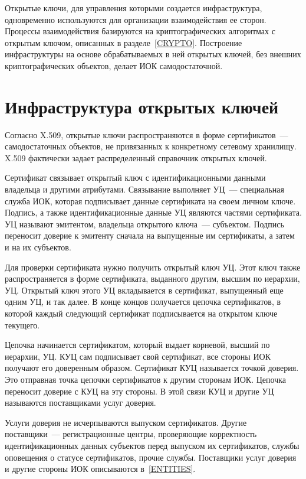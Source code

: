 Открытые ключи, для управления которыми создается инфраструктура,
одновременно используются для организации взаимодействия ее сторон.
%
Процессы взаимодействия базируются на криптографических алгоритмах 
с открытым ключом, описанных в разделе~\ref{CRYPTO}.
%
Построение инфраструктуры на основе обрабатываемых в ней открытых ключей,
без внешних криптографических объектов, делает ИОК самодостаточной.

\section{Инфраструктура открытых ключей}

Согласно X.509, открытые ключи распространяются в форме сертификатов~--- 
самодостаточных объектов, не привязанных к конкретному сетевому хранилищу. 
X.509 фактически задает распределенный справочник открытых ключей.  

Сертификат связывает открытый ключ с идентификационными данными владельца
и другими атрибутами. Связывание выполняет УЦ~--- специальная служба 
ИОК, которая  подписывает данные сертификата на своем личном ключе. Подпись,
а также идентификационные данные УЦ являются частями сертификата.
УЦ называют эмитентом, владельца открытого ключа~--- субъектом. Подпись 
переносит доверие к эмитенту сначала на выпущенные им сертификаты, а затем 
и на их субъектов. 

Для проверки сертификата нужно получить открытый ключ УЦ. 
Этот ключ также распространяется в форме сертификата, выданного другим, 
высшим по иерархии, УЦ. Открытый ключ этого УЦ вкладывается в сертификат,
выпущенный еще одним УЦ, и так далее. В конце концов получается цепочка сертификатов,
в которой каждый следующий сертификат подписывается на открытом ключе текущего.

Цепочка начинается сертификатом, который выдает корневой, высший по 
иерархии, УЦ. КУЦ сам подписывает свой сертификат, все стороны ИОК
получают его доверенным образом. Сертификат КУЦ называется точкой доверия. 
Это отправная точка цепочки сертификатов к другим сторонам ИОК. 
Цепочка переносит доверие с КУЦ на эту стороны. В этой связи КУЦ и другие 
УЦ называются поставщиками услуг доверия.

Услуги доверия не исчерпываются выпуском сертификатов.
Другие поставщики~--- регистрационные центры, проверяющие корректность 
идентификационных данных субъектов перед выпуском их сертификатов,
службы оповещения о статусе сертификатов, прочие службы.
%
Поставщики услуг доверия и другие стороны ИОК описываются в~\ref{ENTITIES}.

